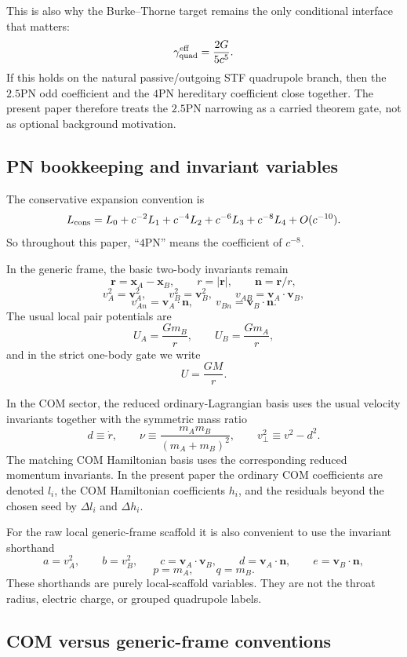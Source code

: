 \documentclass[11pt]{article}
\begin{document}
This is also why the Burke--Thorne target remains the only conditional interface
that matters:
\[
\gamma_{\rm quad}^{\rm eff}=\frac{2G}{5c^5}.
\]
If this holds on the natural passive/outgoing STF quadrupole branch, then the
$2.5$PN odd coefficient and the $4$PN hereditary coefficient close together.
The present paper therefore treats the $2.5$PN narrowing as a carried theorem
gate, not as optional background motivation.

\subsection{PN bookkeeping and invariant variables}
\label{sec:dictionary-pn-bookkeeping}

The conservative expansion convention is
\[
L_{\rm cons}=L_0+c^{-2}L_1+c^{-4}L_2+c^{-6}L_3+c^{-8}L_4+O(c^{-10}).
\]
So throughout this paper, ``$4$PN'' means the coefficient of $c^{-8}$.

In the generic frame, the basic two-body invariants remain
\[
\mathbf r=\mathbf x_A-\mathbf x_B,
\qquad
r=|\mathbf r|,
\qquad
\mathbf n=\mathbf r/r,
\]
\[
v_A^2=\mathbf v_A^2,
\qquad
v_B^2=\mathbf v_B^2,
\qquad
v_{AB}=\mathbf v_A\!\cdot\!\mathbf v_B,
\]
\[
v_{An}=\mathbf v_A\!\cdot\!\mathbf n,
\qquad
v_{Bn}=\mathbf v_B\!\cdot\!\mathbf n.
\]
The usual local pair potentials are
\[
U_A=\frac{Gm_B}{r},
\qquad
U_B=\frac{Gm_A}{r},
\]
and in the strict one-body gate we write
\[
U=\frac{GM}{r}.
\]

In the COM sector, the reduced ordinary-Lagrangian basis uses the usual
velocity invariants together with the symmetric mass ratio
\[
d\equiv \dot r,
\qquad
\nu\equiv\frac{m_A m_B}{(m_A+m_B)^2},
\qquad
v_\perp^2\equiv v^2-d^2.
\]
The matching COM Hamiltonian basis uses the corresponding reduced momentum
invariants.  In the present paper the ordinary COM coefficients are denoted
$l_i$, the COM Hamiltonian coefficients $h_i$, and the residuals beyond the
chosen seed by $\Delta l_i$ and $\Delta h_i$.

For the raw local generic-frame scaffold it is also convenient to use the
invariant shorthand
\[
a=v_A^2,
\qquad
b=v_B^2,
\qquad
c=\mathbf v_A\!\cdot\!\mathbf v_B,
\qquad
d=\mathbf v_A\!\cdot\!\mathbf n,
\qquad
e=\mathbf v_B\!\cdot\!\mathbf n,
\]
\[
p=m_A,
\qquad
q=m_B.
\]
These shorthands are purely local-scaffold variables.  They are not the throat
radius, electric charge, or grouped quadrupole labels.

\subsection{COM versus generic-frame conventions}
\label{sec:dictionary-com-vs-generic}
\end{document}
